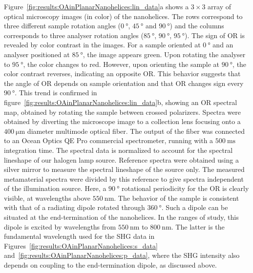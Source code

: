Figure~\ref{fig:results:OAinPlanarNanohelices:lin_data}a shows a $3 \times 3$ array of optical microscopy images (in color) of the nanohelices. The rows correspond to three different sample rotation angles ($\SI{0}{\degree}$, $\SI{45}{\degree}$ and $\SI{90}{\degree}$) and the columns corresponds to three analyser rotation angles ($\SI{85}{\degree}$, $\SI{90}{\degree}$, $\SI{95}{\degree}$).
The sign of OR is revealed by color contrast in the images. For a sample oriented at $\SI{0}{\degree}$ and an analyser positioned at $\SI{85}{\degree}$, the image appears green.
Upon rotating the analyser to $\SI{95}{\degree}$, the color changes to red. However, upon orienting the sample at $\SI{90}{\degree}$, the color contrast reverses, indicating an opposite OR. This behavior suggests that the angle of OR depends on sample orientation and that OR changes sign every $\SI{90}{\degree}$. 
This trend is confirmed in figure~\ref{fig:results:OAinPlanarNanohelices:lin_data}b, showing an OR spectral map, obtained by rotating the sample between crossed polarizers. 
Spectra were obtained by diverting the microscope image to a collection lens focusing onto a $\SI{400}{\micro\m}$ diameter multimode optical fiber. The output of the fiber was connected to an Ocean Optics QE Pro commercial spectrometer, running with a $\SI{500}{\milli\s}$ integration time. The spectral data is normalized to account for the spectral lineshape of our halogen lamp source. Reference spectra were obtained using a silver mirror to measure the spectral lineshape of the source only. The measured metamaterial spectra were divided by this reference to give spectra independent of the illumination source.
Here, a $\SI{90}{\degree}$ rotational periodicity for the OR is clearly visible, at wavelengths above $\SI{550}{\nano\m}$. The behavior of the sample is consistent with that of a radiating dipole rotated through $\SI{360}{\degree}$. Such a dipole can be situated at the end-termination of the nanohelices. In the ranges of study, this dipole is excited by wavelengths from $\SI{550}{\nano\m}$ to $\SI{800}{\nano\m}$. The latter is the fundamental wavelength used for the SHG data in Figures~\ref{fig:results:OAinPlanarNanohelices:s_data} and~\ref{fig:results:OAinPlanarNanohelices:p_data}, where the SHG intensity also depends on coupling to the end-termination dipole, as discussed above.

